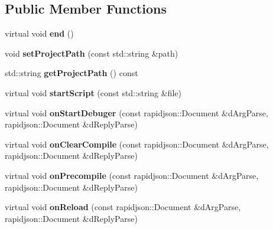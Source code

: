 \subsection*{Public Member Functions}
\begin{DoxyCompactItemize}
\item 
\mbox{\label{classRuntimeProtocol_aa46a3707a3e5ee4dda660768ba635676}} 
virtual void {\bfseries end} ()
\item 
\mbox{\label{classRuntimeProtocol_ab6e6f0b9a75e3ab642846491324ac7de}} 
void {\bfseries set\+Project\+Path} (const std\+::string \&path)
\item 
\mbox{\label{classRuntimeProtocol_a1614a070642e18076d5c38e56bf5613d}} 
std\+::string {\bfseries get\+Project\+Path} () const
\item 
\mbox{\label{classRuntimeProtocol_aee04784e23f15a2ebd5bcc938b8b6d47}} 
virtual void {\bfseries start\+Script} (const std\+::string \&file)
\item 
\mbox{\label{classRuntimeProtocol_a0f904d2562c047f9e9a3fc5399250846}} 
virtual void {\bfseries on\+Start\+Debuger} (const rapidjson\+::\+Document \&d\+Arg\+Parse, rapidjson\+::\+Document \&d\+Reply\+Parse)
\item 
\mbox{\label{classRuntimeProtocol_a2fb87a9cc21ebefa3936f4e14b00c025}} 
virtual void {\bfseries on\+Clear\+Compile} (const rapidjson\+::\+Document \&d\+Arg\+Parse, rapidjson\+::\+Document \&d\+Reply\+Parse)
\item 
\mbox{\label{classRuntimeProtocol_af67879ec1b7e14fc20ac4e405e12cce2}} 
virtual void {\bfseries on\+Precompile} (const rapidjson\+::\+Document \&d\+Arg\+Parse, rapidjson\+::\+Document \&d\+Reply\+Parse)
\item 
\mbox{\label{classRuntimeProtocol_ab2a46d1d5c4f5a29b5ddd3bf57fb394a}} 
virtual void {\bfseries on\+Reload} (const rapidjson\+::\+Document \&d\+Arg\+Parse, rapidjson\+::\+Document \&d\+Reply\+Parse)
\item 
\mbox{\label{classRuntimeProtocol_ae00da166339cc7112cf14222603416ef}} 

\end{DoxyCompactItemize}
